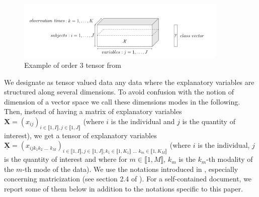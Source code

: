 \documentclass[preprint,12pt]{elsarticle}
\begin{document}
\begin{figure}[tbp]
    \includegraphics[width=0.9\textwidth]{images/tensor.png}
    \caption{Example of order 3 tensor from \cite{multi_rank_r}}
    \label{fig:tensor}
\end{figure}
\noindent We designate as tensor valued data any data where the explanatory variables are structured along several dimensions. To avoid confusion with the notion of dimension of a vector space we call these dimensions modes in the following. Then, instead of having a matrix of explanatory variables $\mathbf{X} = (x_{ij})_{i \in \llbracket 1, I \rrbracket, j \in \llbracket 1, J \rrbracket}$ (where $i$ is the individual and $j$ is the quantity of interest), we get a tensor of explanatory variables $\underline{\mathbf{X}} = (x_{ijk_1k_2\text{ ... }k_M})_{i \in \llbracket 1, I \rrbracket, j \in \llbracket 1, J \rrbracket, k_1 \in \llbracket 1, K_1 \rrbracket \text{ ... } k_m \in\llbracket 1, K_M \rrbracket } $  (where $i$ is the individual, $j$ is the quantity of interest and where for $m \in \llbracket 1, M \rrbracket$, $k_m$ is the $k_m$-th modality of the $m$-th mode of the data). We use the notations introduced in \cite{conventions}, especially concerning matricization (see section 2.4 of \cite{conventions}). For a self-contained document, we report some of them below in addition to the notations specific to this paper.\\
\end{document}
